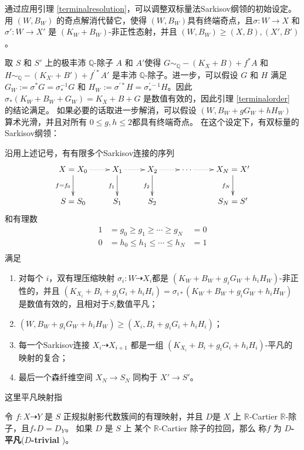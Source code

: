 通过应用引理 \ref{terminalresolution}，可以调整双标量法Sarkisov纲领的初始设定。用 $(W,B_W)$ 的奇点解消代替它，使得 $(W,B_{W})$具有终端奇点，且$\sigma:W\to X$ 和$\sigma':W\to X'$ 是 $(K_W+B_W)$-非正性态射，并且 $(W,B_W)\geqslant (X,B),(X',B')$。

  取 $ S $ 和 $ S' $ 上的极丰沛 $\mathbb{Q}$-除子 $ A $ 和 $ A' $使得 $ G\sim_{\mathbb{Q}}-(K_X+B)+f^*A $ 和 $ H\sim_{\mathbb{Q}}-(K_{X'}+B')+f^{'*}A' $ 是丰沛 $\mathbb{Q}$-除子。进一步，可以假设 $ G $ 和 $ H $ 满足 $G_{W}:= \sigma^*G=\sigma^{-1}_*G $ 和 $ H_{W}:=\sigma^{'*}H=\sigma^{'-1}_*H $。因此 $\sigma_{*}(K_{W}+B_{W}+G_{W})=K_{X}+B+G$ 是数值有效的，因此引理 \ref{terminalorder} 的结论满足。
如果必要的话取进一步解消，可以假设
 $(W, B_W+gG_W+hH_W)$ 算术光滑，并且对所有 $0\leqslant g,h\leqslant 2$都具有终端奇点。
 在这个设定下，有双标量的Sarkisov纲领：
\begin{theorem}[双标量Sarkisov纲领]\label{main2}
  \cite[Claim 13.12]{haconMinimalModelProgram2012}
  沿用上述记号，有有限多个Sarkisov连接的序列
  \[
    \xymatrix{
    X=X_0\ar@{.>}[r]\ar[d]_{f=f_{0}}&X_{1}\ar@{.>}[r]\ar[d]_{f_{1}}& X_{2}\ar[d]_{f_{2}}\ar@{.>}[r] &\cdots\ar@{.>}[r]&X_N=X'\ar[d]_{f_{N}} \\
    S=S_{0}&S_{1} &S_{2}&&S_N=S'
    }
  \]
  和有理数
  \[
    \begin{aligned}
      1 & =g_0\geqslant g_1 \geqslant \cdots \geqslant g_N   & =0 \\
      0 & =h_0\leqslant h_{1} \leqslant \cdots \leqslant h_N & =1 \\
    \end{aligned}
  \]
  满足
  \begin{enumerate}
    \item 对每个 $i$，双有理压缩映射 $\sigma_i:W\dashrightarrow  X_{i}$都是 $(K_{W}+B_{W}+g_{i}G_{W}+h_{i}H_{W})$-非正性的，并且 $(K_{X_{i}}+B_{i}+g_{i}G_{i}+h_{i}H_{i})=\sigma_{i*}(K_{W}+B_{W}+g_{i}G_{W}+h_{i}H_{W})$ 是数值有效的，且相对于$S_{i}$数值平凡；
    \item $(W,B_{W}+g_{i}G_{W}+h_{i}H_{W})\geqslant (X_{i},B_{i}+g_{i}G_{i}+h_{i}H_{i})$；
    \item 每一个Sarkisov连接 $X_{i}\dashrightarrow X_{i+1}$ 都是一组 $(K_{X_{i}}+B_{i}+g_{i}G_{i}+h_{i}H_{i})$-平凡的映射的复合；
    \item 最后一个森纤维空间 $X_{N} \to S_{N}$ 同构于 $X'\to S'$。
  \end{enumerate}
\end{theorem}
这里平凡映射指
\begin{definition}\label{trivialmap}
  \cite[\S 13.2]{haconMinimalModelProgram2012} 令 $f:X\dashrightarrow Y$ 是 $S$ 正规拟射影代数簇间的有理映射，并且 $D$是 $X$  上  $\mathbb{R}$-Cartier $\mathbb{R}$-除子，且$f_*D=D_Y$。   如果 $D$ 是 $S$ 上 某个  $\mathbb{R}$-Cartier 除子的拉回，那么 称$f$ 为 \textbf{$D$-平凡}(\textbf{$D$-trivial })。
\end{definition}

